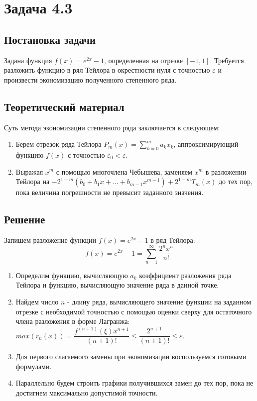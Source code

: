 \section*{Задача 4.3}
\subsection*{Постановка задачи}
Задана функция $f(x) = e^{2x} - 1$, определенная на отрезке $[-1, 1]$. Требуется разложить функцию в рял Тейлора в окрестности нуля с точностью $\varepsilon$ и произвести экономизацию полученного степенного ряда.

\subsection*{Теоретический материал}
Суть метода экономизации степенного ряда заключается в следующем:

\begin{enumerate}
	\item Берем отрезок ряда Тейлора $P_m(x) = \sum\limits_{k = 0}^m a_kx_k$, аппроксимирующий функцию $f(x)$ с точностью $\varepsilon_0 < \varepsilon$.
	\item Выражая $x^m$ с помощью многочлена Чебышева, заменяем $x^m$ в разложении Тейлора на $-2^{1 - m}(b_0 + b_1x + \dots + b_{m - 1} x^{m-1}) + 2^{1 - m}T_m(x)$ до тех пор, пока величина погрешности не превысит заданного значения.
\end{enumerate}

\subsection*{Решение}
Запишем разложение функции $f(x) = e^{2x} - 1$ в ряд Тейлора:
\[
	f(x) = e^{2x} - 1 = \sum\limits_{n = 1}^\infty \dfrac{2^nx^n}{n!}
\]

\begin{enumerate}
	\item Определим функцию, вычисляющую $a_k$ коэффициент разложения ряда Тейлора и функцию, вычисляющую значение ряда в данной точке.
	\item Найдем число $n$ - длину ряда, вычисляющего значение функции на заданном отрезке с необходимой точностью с помощью оценки сверху для остаточного члена разложения в форме Лагранжа: $max(r_n(x)) = \dfrac{f^{(n+1)}(\xi)x^{n+1}}{(n+1)!} \leq \dfrac{2^{n+1}}{(n+1)!} \leq \varepsilon$.
	\item Для первого слагаемого замены при экономизации воспользуемся готовыми формулами.
	\item Параллельно будем строить графики получившихся замен до тех пор, пока не достигнем максимально допустимой точности.
\end{enumerate}

